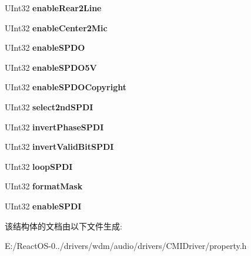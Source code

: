 \begin{DoxyCompactItemize}
\item 
\mbox{\label{struct_c_m_i_d_a_t_a_a5792ab20ab553256f479c54b322eb98d}} 
U\+Int32 {\bfseries enable\+Rear2\+Line}
\item 
\mbox{\label{struct_c_m_i_d_a_t_a_a6660f5e1600a9283586334057a58f993}} 
U\+Int32 {\bfseries enable\+Center2\+Mic}
\item 
\mbox{\label{struct_c_m_i_d_a_t_a_acccbec682f0291312e84fd0c45a97f9e}} 
U\+Int32 {\bfseries enable\+S\+P\+DO}
\item 
\mbox{\label{struct_c_m_i_d_a_t_a_a40cc111a11c3a800ed9591d9a0c849ff}} 
U\+Int32 {\bfseries enable\+S\+P\+D\+O5V}
\item 
\mbox{\label{struct_c_m_i_d_a_t_a_aa4d2a854f77c22518d40bfa7d00c300e}} 
U\+Int32 {\bfseries enable\+S\+P\+D\+O\+Copyright}
\item 
\mbox{\label{struct_c_m_i_d_a_t_a_a6fbc39e923872c182990f5e1cbe7849c}} 
U\+Int32 {\bfseries select2nd\+S\+P\+DI}
\item 
\mbox{\label{struct_c_m_i_d_a_t_a_a7042550934878982fe1c5e24058f0766}} 
U\+Int32 {\bfseries invert\+Phase\+S\+P\+DI}
\item 
\mbox{\label{struct_c_m_i_d_a_t_a_ac497b272ba9a3ec61c4d52ba80566437}} 
U\+Int32 {\bfseries invert\+Valid\+Bit\+S\+P\+DI}
\item 
\mbox{\label{struct_c_m_i_d_a_t_a_a2aa64062f6c323ffd5828dfb2b0acde5}} 
U\+Int32 {\bfseries loop\+S\+P\+DI}
\item 
\mbox{\label{struct_c_m_i_d_a_t_a_a887dd9672bbec35bff0e199215ccc155}} 
U\+Int32 {\bfseries format\+Mask}
\item 
\mbox{\label{struct_c_m_i_d_a_t_a_aa240c45ec531a0c3a35a08705e06db7c}} 
U\+Int32 {\bfseries enable\+S\+P\+DI}
\end{DoxyCompactItemize}


该结构体的文档由以下文件生成\+:\begin{DoxyCompactItemize}
\item 
E\+:/\+React\+O\+S-\/0../drivers/wdm/audio/drivers/\+C\+M\+I\+Driver/property.\+h\end{DoxyCompactItemize}
